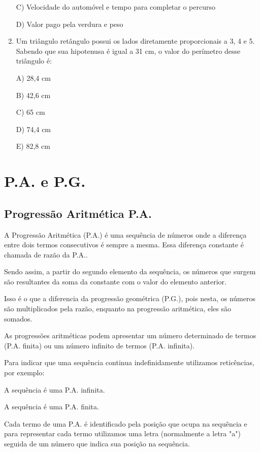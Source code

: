 \begin{multicols*}{2}
\begin{enumerate}
C) Velocidade do automóvel e tempo para completar o percurso

D) Valor pago pela verdura e peso

\item Um triângulo retângulo possui os lados diretamente proporcionais a 3, 4 e 5. Sabendo que sua hipotenusa é igual a 31 cm, o valor do perímetro desse triângulo é:

A) 28,4 cm

B) 42,6 cm

C) 65 cm

D) 74,4 cm

E) 82,8 cm
	
	\end{enumerate}

\section{P.A. e P.G.}	

\subsection{Progressão Aritmética P.A.}

A Progressão Aritmética (P.A.) é uma sequência de números onde a diferença entre dois termos consecutivos é sempre a mesma. Essa diferença constante é chamada de razão da P.A..

Sendo assim, a partir do segundo elemento da sequência, os números que surgem são resultantes da soma da constante com o valor do elemento anterior.

Isso é o que a diferencia da progressão geométrica (P.G.), pois nesta, os números são multiplicados pela razão, enquanto na progressão aritmética, eles são somados.

As progressões aritméticas podem apresentar um número determinado de termos (P.A. finita) ou um número infinito de termos (P.A. infinita).

Para indicar que uma sequência continua indefinidamente utilizamos reticências, por exemplo:

A sequência  é uma P.A. infinita.

A sequência  é uma P.A. finita.

Cada termo de uma P.A. é identificado pela posição que ocupa na sequência e para representar cada termo utilizamos uma letra (normalmente a letra "a") seguida de um número que indica sua posição na sequência.


\end{multicols*}
